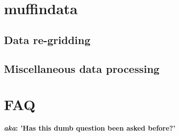 \documentclass[11pt,fleqn]{book} %
\begin{document}

\cleardoublepage


\chapter{muffindata}

\hfill \break
\vspace{24mm}


\newpage


\section{Data re-gridding}


\newpage


\section{Miscellaneous data processing}


\cleardoublepage


\chapter{FAQ}

\hfill \break
\vspace{24mm}

\noindent \huge \textbf{\textit{aka}: 'Has this dumb question been asked before?'}\normalsize


\newpage
\end{document}

